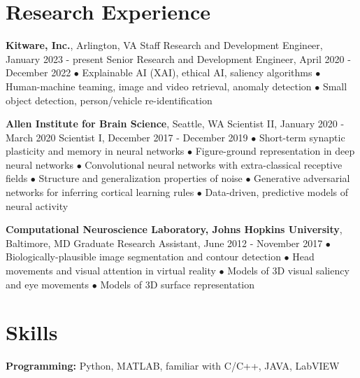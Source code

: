 \documentclass[10pt,letterpaper]{article}
\renewenvironment{itemize}{
  \begin{list}{}{
    \setlength{\leftmargin}{1.5em}
    \setlength{\itemsep}{0.25em}
    \setlength{\parskip}{0pt}
    \setlength{\parsep}{0.25em}
  }
}{
  \end{list}
}
\begin{document}
\section*{Research Experience}
\vspace{-0.05in}
\begin{itemize}
\item \textbf{Kitware, Inc.}, Arlington, VA
  \subitem Staff Research and Development Engineer, January 2023 - present
  \subitem Senior Research and Development Engineer, April 2020 - December 2022
  \subitem$\bullet$ Explainable AI (XAI), ethical AI, saliency algorithms
  \subitem$\bullet$ Human-machine teaming, image and video retrieval, anomaly detection
  \subitem$\bullet$ Small object detection, person/vehicle re-identification

  \item \textbf{Allen Institute for Brain Science}, Seattle, WA
  \subitem Scientist II, January 2020 - March 2020
  \subitem Scientist I, December 2017 - December 2019
  \subitem$\bullet$ Short-term synaptic plasticity and memory in neural networks
  \subitem$\bullet$ Figure-ground representation in deep neural networks
  \subitem$\bullet$ Convolutional neural networks with extra-classical receptive fields
  \subitem$\bullet$ Structure and generalization properties of noise
  \subitem$\bullet$ Generative adversarial networks for inferring cortical learning rules
  \subitem$\bullet$ Data-driven, predictive models of neural activity
  
  \item \textbf{Computational Neuroscience Laboratory, Johns Hopkins University}, Baltimore, MD
  \subitem Graduate Research Assistant, June 2012 - November 2017
  \subitem$\bullet$ Biologically-plausible image segmentation and contour detection
  \subitem$\bullet$ Head movements and visual attention in virtual reality
  \subitem$\bullet$ Models of 3D visual saliency and eye movements
  \subitem$\bullet$ Models of 3D surface representation
\end{itemize}

\vspace{-0.25in}

\section*{Skills}
\vspace{-0.05in}
\hspace{1.5em}\textbf{Programming:} Python, MATLAB, familiar with C/C++, JAVA, LabVIEW
\end{document}
